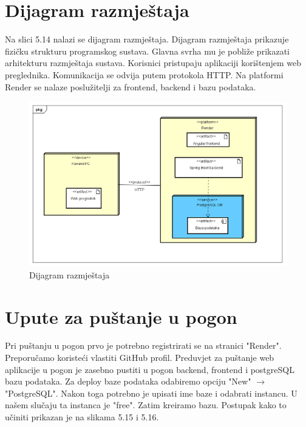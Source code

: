 		\vspace{324pt}	 
		\section{Dijagram razmještaja}
			
			Na slici 5.14 nalazi se dijagram razmještaja. Dijagram razmještaja prikazuje fizičku strukturu programskog sustava. Glavna svrha mu je pobliže prikazati arhitekturu razmještaja sustava. Korisnici pristupaju aplikaciji korištenjem web preglednika. Komunikacija se odvija putem protokola HTTP. Na platformi Render se nalaze poslužitelji za frontend, backend i bazu podataka.
			
			\begin{figure}[H]
				\centering
				\includegraphics[width=\textwidth]{slike/Dijagram_razmjestaja.PNG}
				\caption{Dijagram razmještaja }
				\label{fig:dijagram_baze}
			\end{figure}
			
		\vspace{108pt}
		
		
		\section{Upute za puštanje u pogon}
		
			Pri puštanju u pogon prvo je potrebno registrirati se na stranici "Render". Preporučamo koristeći vlastiti GitHub profil. Preduvjet za puštanje web aplikacije u pogon je zasebno pustiti u pogon backend, frontend i postgreSQL bazu podataka. Za deploy baze podataka odabiremo opciju "New" $\rightarrow$  "PostgreSQL". Nakon toga potrebno je upisati ime baze i odabrati instancu. U našem slučaju ta instanca je "free". Zatim kreiramo bazu. Postupak kako to učiniti prikazan je na slikama 5.15 i 5.16. 
			
